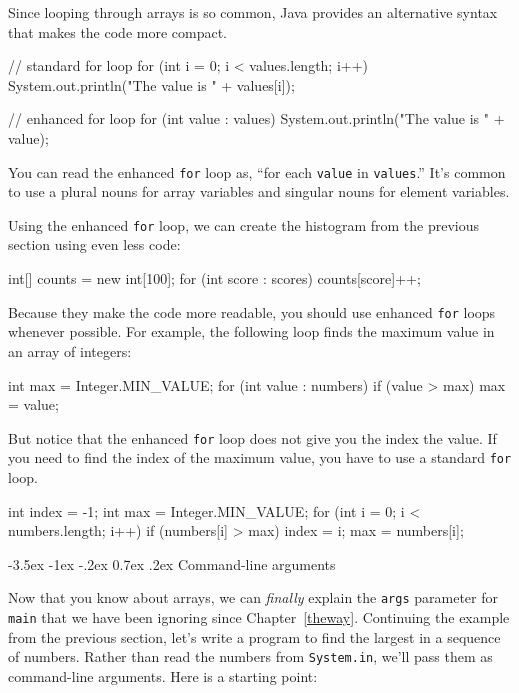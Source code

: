 \documentclass[12pt]{book}
\makeatletter
\theoremstyle{exercise}
\newcommand{\java}[1]{\verb"#1"}
\renewcommand{\section}{\@startsection{section}{1}{\z@}%
    {-3.5ex \@plus -1ex \@minus -.2ex}%
    {0.7ex \@plus.2ex}%
    {\normalfont\Large\bfseries}}
\newcommand{\java}[1]{\lstinline{#1}} %
\makeatother
\begin{document}
Since looping through arrays is so common, Java provides an alternative syntax that makes the code more compact.

\begin{code}
    // standard for loop
    for (int i = 0; i < values.length; i++) {
        System.out.println("The value is " + values[i]);
    }

    // enhanced for loop
    for (int value : values) {
        System.out.println("The value is " + value);
    }
\end{code}

You can read the enhanced \java{for} loop as, ``for each \java{value} in \java{values}.''
It's common to use a plural nouns for array variables and singular nouns for element variables.

Using the enhanced \java{for} loop, we can create the histogram from the previous section using even less code:

\begin{code}
    int[] counts = new int[100];
    for (int score : scores) {
        counts[score]++;
    }
\end{code}

Because they make the code more readable, you should use enhanced \java{for} loops whenever possible.
For example, the following loop finds the maximum value in an array of integers:

\begin{code}
    int max = Integer.MIN_VALUE;
    for (int value : numbers) {
        if (value > max) {
            max = value;
        }
    }
\end{code}

But notice that the enhanced \java{for} loop does not give you the index the value.
If you need to find the index of the maximum value, you have to use a standard \java{for} loop.

\begin{code}
    int index = -1;
    int max = Integer.MIN_VALUE;
    for (int i = 0; i < numbers.length; i++) {
        if (numbers[i] > max) {
            index = i;
            max = numbers[i];
        }
    }
\end{code}


\section{Command-line arguments}

Now that you know about arrays, we can {\em finally} explain the \java{args} parameter for \java{main} that we have been ignoring since Chapter~\ref{theway}.
Continuing the example from the previous section, let's write a program to find the largest in a sequence of numbers.
Rather than read the numbers from \java{System.in}, we'll pass them as command-line arguments.
Here is a starting point:
\end{document}
